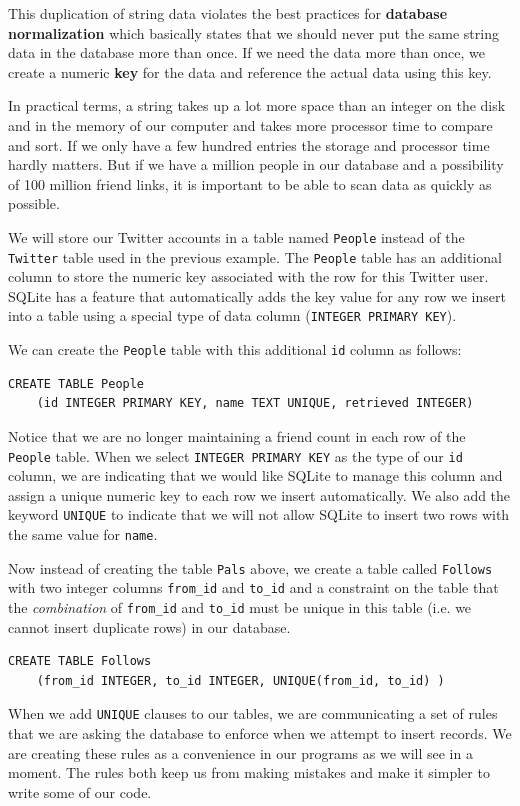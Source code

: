\documentclass[11pt]{book}
\begin{document}
This duplication of string data violates the best practices 
for {\bf database normalization} which basically states that
we should never put the same string data in the database more than once.  
If we need the data more than once, we create a 
numeric {\bf key} for the data and reference the actual data 
using this key.

In practical terms, a string takes up a lot more 
space than an integer on the disk
and in the memory of our computer and takes more processor time
to compare and sort.  If we only have a few hundred entries 
the storage and processor time hardly matters.  But if we have 
a million people in our database and a possibility of 100 million
friend links, it is important to be able to scan data as quickly
as possible.

We will store our Twitter accounts in a table named {\tt People}
instead of the {\tt Twitter} table used in the previous example.
The {\tt People} table has an additional column 
to store the numeric key associated with the 
row for this Twitter user.   
SQLite has a feature that automatically adds the key value
for any row we insert into a table using a special type of 
data column ({\tt INTEGER PRIMARY KEY}).

We can create the {\tt People} table with this additional 
{\tt id} column as follows:

\beforeverb
\begin{verbatim}
CREATE TABLE People 
    (id INTEGER PRIMARY KEY, name TEXT UNIQUE, retrieved INTEGER)
\end{verbatim}
\afterverb
%
Notice that we are no longer maintaining a friend count in each row
of the {\tt People} table.
When we select {\tt INTEGER PRIMARY KEY} as the type of our {\tt id} column,
we are indicating that we would like SQLite to manage this column and 
assign a unique numeric key to each row we insert automatically.
We also add the keyword {\tt UNIQUE} to indicate that we will not 
allow SQLite to insert two rows with the same value for {\tt name}.

Now instead of creating the table {\tt Pals} above, we create
a table called {\tt Follows} with two integer columns
\verb"from_id" and \verb"to_id" and a constraint on the table that
the \emph{combination} of \verb"from_id" and \verb"to_id" must be unique 
in this table (i.e. we cannot insert duplicate rows) in our database.

\beforeverb
\begin{verbatim}
CREATE TABLE Follows 
    (from_id INTEGER, to_id INTEGER, UNIQUE(from_id, to_id) )
\end{verbatim}
\afterverb
%
When we add {\tt UNIQUE} clauses to our tables, we are communicating a set
of rules that we are asking the database to enforce when we attempt to insert
records.   We are creating these rules as a convenience in our programs as we
will see in a moment.  The rules both keep us from making mistakes and make
it simpler to write some of our code.
\end{document}
